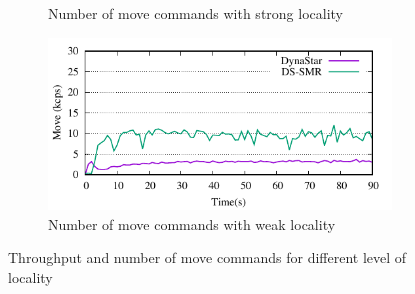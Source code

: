 \begin{figure}[ht!]
\begin{subfigure}[b]{0.45\textwidth}
    \caption{Number of move commands with strong locality }
  \end{subfigure}
  \begin{subfigure}[b]{0.45\textwidth}
    \centering
    \includegraphics[width=0.95\columnwidth]{figures/experiments/move-dynastar-vs-dssmr-4p}
    \caption{Number of move commands with weak locality}
  \end{subfigure}
  \caption{Throughput and number of move commands for different level of locality}
  \label{fig:motivation}
\end{figure}


